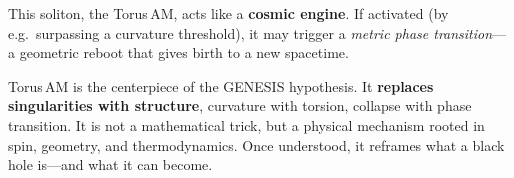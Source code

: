 \documentclass{article}
\begin{document}
This soliton, the Torus\,AM, acts like a \textbf{cosmic engine}. If activated (by e.g.\ surpassing a curvature threshold), it may trigger a \textit{metric phase transition}—a geometric reboot that gives birth to a new spacetime.

\begin{tcolorbox}[colback=gray!5, colframe=black!30, title=Why this matters]
Torus\,AM is the centerpiece of the \textsc{GENESIS} hypothesis. It \textbf{replaces singularities with structure}, curvature with torsion, collapse with phase transition. It is not a mathematical trick, but a physical mechanism rooted in spin, geometry, and thermodynamics. Once understood, it reframes what a black hole is—and what it can become.
\end{tcolorbox}







\end{document}
